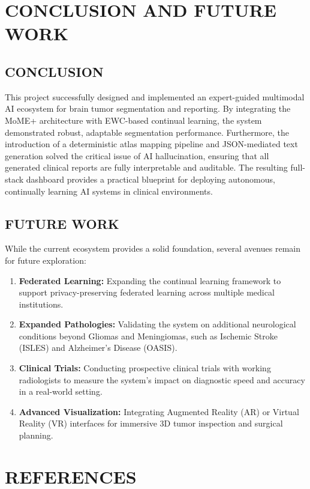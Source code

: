 \documentclass[12pt, a4paper]{report}
\begin{document}
\chapter{CONCLUSION AND FUTURE WORK}

\section{CONCLUSION}
This project successfully designed and implemented an expert-guided multimodal AI ecosystem for brain tumor segmentation and reporting. By integrating the MoME+ architecture with EWC-based continual learning, the system demonstrated robust, adaptable segmentation performance. Furthermore, the introduction of a deterministic atlas mapping pipeline and JSON-mediated text generation solved the critical issue of AI hallucination, ensuring that all generated clinical reports are fully interpretable and auditable. The resulting full-stack dashboard provides a practical blueprint for deploying autonomous, continually learning AI systems in clinical environments.

\section{FUTURE WORK}
While the current ecosystem provides a solid foundation, several avenues remain for future exploration:
\begin{enumerate}
    \item \textbf{Federated Learning:} Expanding the continual learning framework to support privacy-preserving federated learning across multiple medical institutions.
    \item \textbf{Expanded Pathologies:} Validating the system on additional neurological conditions beyond Gliomas and Meningiomas, such as Ischemic Stroke (ISLES) and Alzheimer's Disease (OASIS).
    \item \textbf{Clinical Trials:} Conducting prospective clinical trials with working radiologists to measure the system's impact on diagnostic speed and accuracy in a real-world setting.
    \item \textbf{Advanced Visualization:} Integrating Augmented Reality (AR) or Virtual Reality (VR) interfaces for immersive 3D tumor inspection and surgical planning.
\end{enumerate}

\chapter*{REFERENCES}


\end{document}
